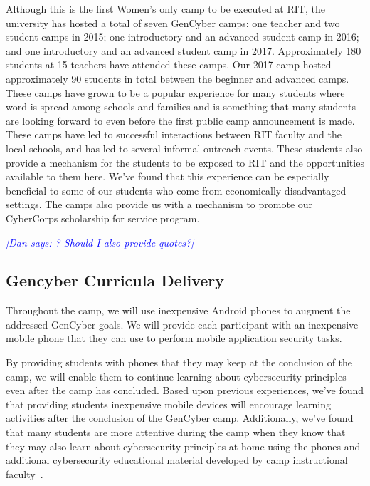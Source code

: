 \documentclass[12pt]{article}
\newcommand{\dan}[1]{\textcolor{blue}{{\it [Dan says: #1]}}}
\begin{document}
Although this is the first Women's only camp to be executed at RIT, the university has hosted a total of seven GenCyber camps: one teacher and two student camps in 2015; one introductory and an advanced student camp in 2016; and one introductory and an advanced student camp in 2017. Approximately 180 students at 15 teachers have attended these camps. Our 2017 camp hosted approximately 90 students in total between the beginner and advanced camps. These camps have grown to be a popular experience for many students where word is spread among schools and families and is something that many students are looking forward to even before the first public camp announcement is made. These camps have led to successful interactions between RIT faculty and the local schools, and has led to several informal outreach events. These students also provide a mechanism for the students to be exposed to RIT and the opportunities available to them here. We've found that this experience can be especially beneficial to some of our students who come from economically disadvantaged settings. The camps also provide us with a mechanism to promote our CyberCorps scholarship for service program.

\dan{? Should I also provide quotes?}

\subsection{Gencyber Curricula Delivery}

Throughout the camp, we will use inexpensive Android phones to augment the addressed GenCyber goals. We will provide each participant with an inexpensive mobile phone that they can use to perform mobile application security tasks. 

By providing students with phones that they may keep at the conclusion of the camp, we will enable them to continue learning about cybersecurity principles even after the camp has concluded. Based upon previous experiences, we've found that providing students inexpensive mobile devices will encourage learning activities after the conclusion of the GenCyber camp. Additionally, we've found that many students are more attentive during the camp when they know that they may also learn about cybersecurity principles at home using the phones and additional cybersecurity educational material developed by camp instructional faculty~\cite{PLASMA_ProjectWebsite_URL, Krutz:2016:TAS:3018995.2994152}. 


\end{document}
